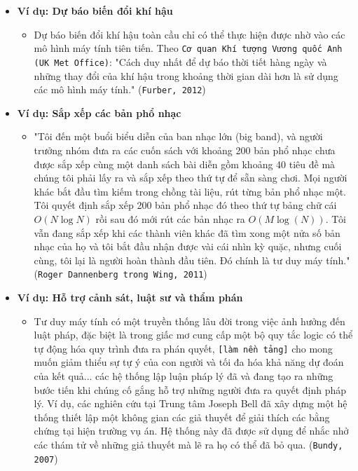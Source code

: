 \begin{itemize}
    \item \textbf{Ví dụ: Dự báo biến đổi khí hậu}
    \begin{itemize}
        \item Dự báo biến đổi khí hậu toàn cầu chỉ có thể thực hiện được nhờ vào các mô hình máy tính tiên tiến. Theo \texttt{Cơ quan Khí tượng Vương quốc Anh (UK Met Office)}: "Cách duy nhất để dự báo thời tiết hàng ngày và những thay đổi của khí hậu trong khoảng thời gian dài hơn là sử dụng các mô hình máy tính." (\texttt{Furber, 2012})
    \end{itemize}

    \item \textbf{Ví dụ: Sắp xếp các bản phổ nhạc}
    \begin{itemize}
        \item "Tôi đến một buổi biểu diễn của ban nhạc lớn (big band), và người trưởng nhóm đưa ra các cuốn sách với khoảng 200 bản phổ nhạc chưa được sắp xếp cùng một danh sách bài diễn gồm khoảng 40 tiêu đề mà chúng tôi phải lấy ra và sắp xếp theo thứ tự để sẵn sàng chơi. Mọi người khác bắt đầu tìm kiếm trong chồng tài liệu, rút từng bản phổ nhạc một. Tôi quyết định sắp xếp 200 bản phổ nhạc đó theo thứ tự bảng chữ cái $O(N \log N)$ rồi sau đó mới rút các bản nhạc ra $O(M \log(N))$. Tôi vẫn đang sắp xếp khi các thành viên khác đã tìm xong một nửa số bản nhạc của họ và tôi bắt đầu nhận được vài cái nhìn kỳ quặc, nhưng cuối cùng, tôi lại là người hoàn thành đầu tiên. Đó chính là tư duy máy tính." (\texttt{Roger Dannenberg trong Wing, 2011})
    \end{itemize}

    \item \textbf{Ví dụ: Hỗ trợ cảnh sát, luật sư và thẩm phán}
    \begin{itemize}
        \item Tư duy máy tính có một truyền thống lâu đời trong việc ảnh hưởng đến luật pháp, đặc biệt là trong giấc mơ cung cấp một bộ quy tắc logic có thể tự động hóa quy trình đưa ra phán quyết, \verb|[làm nền tảng]| cho mong muốn giảm thiểu sự tự ý của con người và tối đa hóa khả năng dự đoán của kết quả... các hệ thống lập luận pháp lý đã và đang tạo ra những bước tiến khi chúng cố gắng hỗ trợ những người đưa ra quyết định pháp lý. Ví dụ, các nghiên cứu tại Trung tâm Joseph Bell đã xây dựng một hệ thống thiết lập một không gian các giả thuyết để giải thích các bằng chứng tại hiện trường vụ án. Hệ thống này đã được sử dụng để nhắc nhở các thám tử về những giả thuyết mà lẽ ra họ có thể đã bỏ qua. (\texttt{Bundy, 2007})
    \end{itemize}

\end{itemize}

